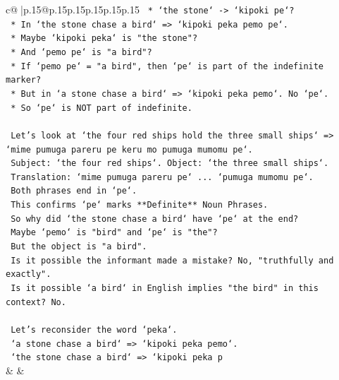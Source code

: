 \documentclass{article}
\begin{document}
{\begin{supertabular}{c@{$\;$}|p{.15\linewidth}@{}p{.15\linewidth}p{.15\linewidth}p{.15\linewidth}p{.15\linewidth}p{.15\linewidth}}
{{{\texttt{                    *   `the stone` {-}> `kipoki pe`?} \\
\texttt{                    *   In `the stone chase a bird` => `kipoki peka pemo pe`.} \\
\texttt{                    *   Maybe `kipoki peka` is "the stone"?} \\
\texttt{                    *   And `pemo pe` is "a bird"?} \\
\texttt{                    *   If `pemo pe` = "a bird", then `pe` is part of the indefinite marker?} \\
\texttt{                    *   But in `a stone chase a bird` => `kipoki peka pemo`. No `pe`.} \\
\texttt{                    *   So `pe` is NOT part of indefinite.} \\
\\ 
\texttt{                    Let's look at `the four red ships hold the three small ships` => `mime pumuga pareru pe keru mo pumuga mumomu pe`.} \\
\texttt{                    Subject: `the four red ships`. Object: `the three small ships`.} \\
\texttt{                    Translation: `mime pumuga pareru pe` ... `pumuga mumomu pe`.} \\
\texttt{                    Both phrases end in `pe`.} \\
\texttt{                    This confirms `pe` marks **Definite** Noun Phrases.} \\
\texttt{                    So why did `the stone chase a bird` have `pe` at the end?} \\
\texttt{                    Maybe `pemo` is "bird" and `pe` is "the"?} \\
\texttt{                    But the object is "a bird".} \\
\texttt{                    Is it possible the informant made a mistake? No, "truthfully and exactly".} \\
\texttt{                    Is it possible `a bird` in English implies "the bird" in this context? No.} \\
\\ 
\texttt{                    Let's reconsider the word `peka`.} \\
\texttt{                    `a stone chase a bird` => `kipoki peka pemo`.} \\
\texttt{                    `the stone chase a bird` => `kipoki peka p} \\
            }
        }
    }
    & & \\ \\


\end{supertabular}}
\end{document}
